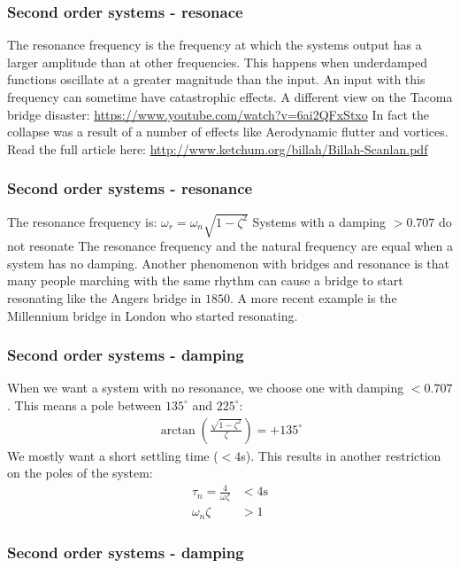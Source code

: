 \begin{frame}
\frametitle{Second order systems - resonace}
The resonance frequency is the frequency at which the systems output has a larger amplitude than at other frequencies. This happens when underdamped functions oscillate at a greater magnitude than the input.
\vspace{0.35cm}
An input with this frequency can sometime have catastrophic effects.
\vspace{0.35cm}
A different view on the Tacoma bridge disaster: \url{https://www.youtube.com/watch?v=6ai2QFxStxo}
\vspace{0.35cm}
In fact the collapse was a result of a number of effects like Aerodynamic flutter and vortices. Read the full article here: \url{http://www.ketchum.org/billah/Billah-Scanlan.pdf}
\end{frame}

\begin{frame}
\frametitle{Second order systems - resonance}
The resonance frequency is: $\omega_r = \omega_n\sqrt{1-\zeta^2}$
\vspace{0.35cm}
Systems with a damping $>0.707$ do not resonate
\vspace{0.35cm}
The resonance frequency and the natural frequency are equal when a system has no damping.
\vspace{0.35cm}
Another phenomenon with bridges and resonance is that many people marching with the same rhythm can cause a bridge to start resonating like the Angers bridge in $1850$. A more recent example is the Millennium bridge in London who started resonating.
\end{frame}

\begin{frame}
\frametitle{Second order systems - damping}
When we want a system with no resonance, we choose one with damping $<0.707$. This means a pole between $135^{\circ}$ and $225^{\circ}$:
\begin{align*}
\arctan(\frac{\sqrt{1-\zeta^2}}{\zeta}) = +135^{\circ}
\end{align*}
We mostly want a short settling time ($<4$s). This results in another restriction on the poles of the system: 
\begin{align*}
\tau_n= \frac{4}{\omega\zeta}&< 4\text{s}\\
\omega_n\zeta&>1
\end{align*}
\end{frame}

\begin{frame}
\frametitle{Second order systems - damping}
\begin{figure}
\end{figure}
\end{frame}


